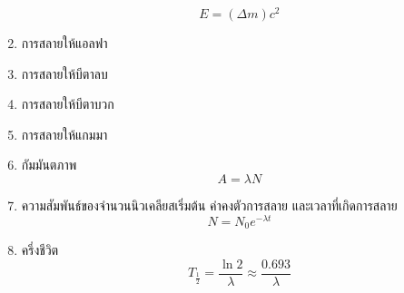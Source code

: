 \documentclass[12pt, a4paper]{article}
\begin{document}
\begin{enumerate}
		\[E=(\Delta m)c^2\]
	\item การสลายให้แอลฟา
	\begin{center}
	\end{center}
	\item การสลายให้บีตาลบ
	\begin{center}
	\end{center}
	\item การสลายให้บีตาบวก
	\begin{center}
	\end{center}
	\item การสลายให้แกมมา
	\begin{center}
	\end{center}
	\item กัมมันตภาพ
		\[A=\lambda N\]
	\item ความสัมพันธ์ของจำนวนนิวเคลียสเริ่มต้น ค่าคงตัวการสลาย และเวลาที่เกิดการสลาย
		\[N=N_0e^{-\lambda t}\]
	\item ครึ่งชีวิต
		\[T_\frac{1}{2}=\frac{\ln 2}{\lambda}\approx\frac{0.693}{\lambda}\]
\end{enumerate}
\end{document}
